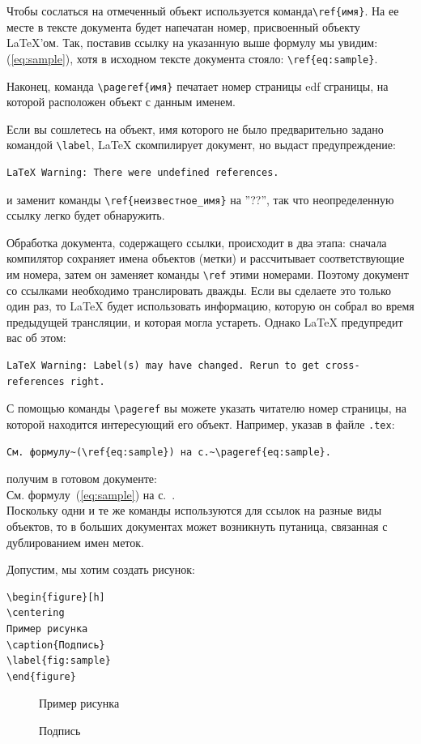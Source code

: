 \documentclass[a4paper,12pt]{article}
\begin{document}
Чтобы сослаться на отмеченный объект используется команда\linebreak \verb|\ref{имя}|.
На ее месте в тексте документа будет напечатан номер, присвоенный объекту LaTeX'ом.
Так, поставив ссылку на указанную выше формулу мы увидим: (\ref{eq:sample}), хотя в исходном тексте документа стояло: \verb|\ref{eq:sample}|.

Наконец, команда \verb|\pageref{имя}| печатает номер страницы edf  сграницы, на которой расположен объект с данным именем.

Если вы сошлетесь на объект, имя которого не было предварительно задано командой \verb|\label|, LaTeX скомпилирует документ, но выдаст предупреждение:
\begin{verbatim}
LaTeX Warning: There were undefined references.
\end{verbatim}
и заменит команды \verb|\ref{неизвестное_имя}| на ''??'', так что неопределенную ссылку легко будет обнаружить.

Обработка документа, содержащего ссылки, происходит в два этапа: сначала компилятор сохраняет имена объектов (метки) и рассчитывает соответствующие им номера, затем он заменяет команды \verb|\ref| этими номерами. Поэтому документ со ссылками необходимо транслировать дважды. Если вы сделаете это только один раз, то LaTeX будет использовать информацию, которую он собрал во время предыдущей трансляции, и которая могла устареть. Однако LaTeX предупредит вас об этом:
\begin{verbatim}
LaTeX Warning: Label(s) may have changed. Rerun to get cross-references right.
\end{verbatim}
С помощью команды \verb|\pageref| вы можете указать читателю номер страницы, на которой находится интересующий его объект. Например, указав в файле \verb|.tex|:
\begin{verbatim}
См. формулу~(\ref{eq:sample}) на с.~\pageref{eq:sample}.
\end{verbatim}
получим в готовом документе:
\\[\baselineskip]
См. формулу~(\ref{eq:sample}) на с.~\pageref{eq:sample}.
\\[\baselineskip]
Поскольку одни и те же команды используются для ссылок на разные виды объектов, то в больших документах может возникнуть путаница, связанная с дублированием имен меток.

Допустим, мы хотим создать рисунок:
\begin{verbatim}
\begin{figure}[h]
\centering
Пример рисунка
\caption{Подпись}
\label{fig:sample}
\end{figure}
\end{verbatim}
\begin{figure}[h]
    \centering
    Пример рисунка
    \caption{Подпись}
    \label{fig:sample}
\end{figure}
\end{document}
